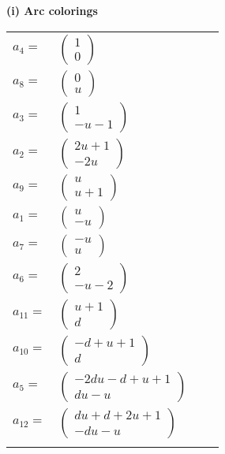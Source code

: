 \documentclass[1p]{elsarticle_modified}
\theoremstyle{definition}
\begin{document}
\flushleft \textbf{(i) Arc colorings}\\
\begin{tabular}{m{7pt} m{180pt} m{7pt} m{180pt} }
\flushright $a_{4}=$&$\begin{pmatrix}1\\0\end{pmatrix}$ \\
\flushright $a_{8}=$&$\begin{pmatrix}0\\u\end{pmatrix}$ \\
\flushright $a_{3}=$&$\begin{pmatrix}1\\- u-1\end{pmatrix}$ \\
\flushright $a_{2}=$&$\begin{pmatrix}2 u+1\\-2 u\end{pmatrix}$ \\
\flushright $a_{9}=$&$\begin{pmatrix}u\\u+1\end{pmatrix}$ \\
\flushright $a_{1}=$&$\begin{pmatrix}u\\- u\end{pmatrix}$ \\
\flushright $a_{7}=$&$\begin{pmatrix}- u\\u\end{pmatrix}$ \\
\flushright $a_{6}=$&$\begin{pmatrix}2\\- u-2\end{pmatrix}$ \\
\flushright $a_{11}=$&$\begin{pmatrix}u+1\\d\end{pmatrix}$ \\
\flushright $a_{10}=$&$\begin{pmatrix}- d+u+1\\d\end{pmatrix}$ \\
\flushright $a_{5}=$&$\begin{pmatrix}-2 d u- d+u+1\\d u- u\end{pmatrix}$ \\
\flushright $a_{12}=$&$\begin{pmatrix}d u+d+2 u+1\\- d u- u\end{pmatrix}$\\&\end{tabular}
\end{document}
